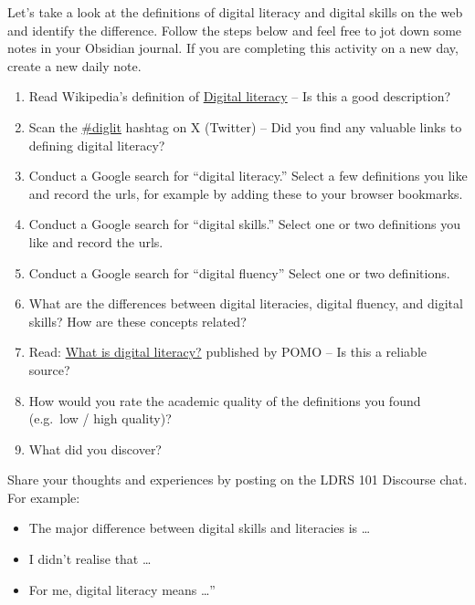 \documentclass[
]{book}
\providecommand{\tightlist}{%
  \setlength{\itemsep}{0pt}\setlength{\parskip}{0pt}}
\theoremstyle{definition}
\theoremstyle{definition}
\theoremstyle{definition}
\theoremstyle{definition}
\theoremstyle{remark}
\begin{document}
\begin{reflect}
Let's take a look at the definitions of digital literacy and digital skills on the web and identify the difference. Follow the steps below and feel free to jot down some notes in your Obsidian journal. If you are completing this activity on a new day, create a new daily note.

\begin{enumerate}
\def\labelenumi{\arabic{enumi}.}
\tightlist
\item
  Read Wikipedia's definition of \href{https://en.wikipedia.org/wiki/Digital_literacy}{Digital literacy} -- Is this a good description?
\item
  Scan the \href{https://twitter.com/i/flow/login?redirect_after_login=\%2Fhashtag\%2Fdiglit\%3Fs\%3D03}{\#diglit} hashtag on X (Twitter) -- Did you find any valuable links to defining digital literacy?
\item
  Conduct a Google search for ``digital literacy.'' Select a few definitions you like and record the urls, for example by adding these to your browser bookmarks.
\item
  Conduct a Google search for ``digital skills.'' Select one or two definitions you like and record the urls.
\item
  Conduct a Google search for ``digital fluency'' Select one or two definitions.
\item
  What are the differences between digital literacies, digital fluency, and digital skills? How are these concepts related?
\item
  Read: \href{http://pomo.com.au/blog/digital-literacy/}{What is digital literacy?} published by POMO -- Is this a reliable source?
\item
  How would you rate the academic quality of the definitions you found (e.g.~low / high quality)?
\item
  What did you discover?
\end{enumerate}

Share your thoughts and experiences by posting on the LDRS 101 Discourse chat. For example:

\begin{itemize}
\tightlist
\item
  The major difference between digital skills and literacies is \ldots{}
\item
  I didn't realise that \ldots{}
\item
  For me, digital literacy means \ldots''
\end{itemize}
\end{reflect}
\end{document}
